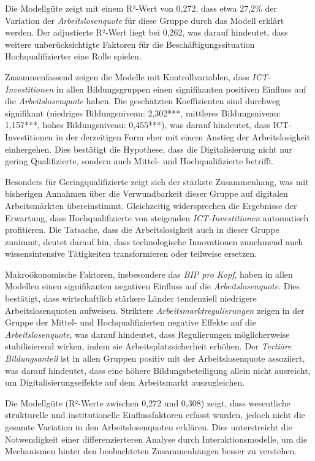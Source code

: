 Die Modellgüte zeigt mit einem R²-Wert von 0,272, dass etwa 27,2\% der Variation der 
\textit{Arbeitslosenquote} für diese Gruppe durch das Modell erklärt werden. Der adjustierte 
R²-Wert liegt bei 0,262, was darauf hindeutet, dass weitere unberücksichtigte Faktoren für die 
Beschäftigungssituation Hochqualifizierter eine Rolle spielen.

Zusammenfassend zeigen die Modelle mit Kontrollvariablen, dass \textit{\ac{ICT}-Investitionen} in 
allen Bildungsgruppen einen signifikanten positiven Einfluss auf die \textit{Arbeitslosenquote} 
haben. Die geschätzten Koeffizienten sind durchweg signifikant (niedriges Bildungsniveau: 
2,302***, mittleres Bildungsniveau: 1,157***, hohes Bildungsniveau: 0,455***), was darauf 
hindeutet, dass \ac{ICT}-Investitionen in der derzeitigen Form eher mit einem Anstieg der 
Arbeitslosigkeit einhergehen. Dies bestätigt die Hypothese, dass die Digitalisierung nicht nur 
gering Qualifizierte, sondern auch Mittel- und Hochqualifizierte betrifft.

Besonders für Geringqualifizierte zeigt sich der stärkste Zusammenhang, was mit bisherigen 
Annahmen über die Verwundbarkeit dieser Gruppe auf digitalen Arbeitsmärkten übereinstimmt. 
Gleichzeitig widersprechen die Ergebnisse der Erwartung, dass Hochqualifizierte von steigenden 
\textit{\ac{ICT}-Investitionen} automatisch profitieren. Die Tatsache, dass die Arbeitslosigkeit 
auch in dieser Gruppe zunimmt, deutet darauf hin, dass technologische Innovationen zunehmend auch 
wissensintensive Tätigkeiten transformieren oder teilweise ersetzen.

Makroökonomische Faktoren, insbesondere das \textit{\ac{BIP} pro Kopf}, haben in allen Modellen 
einen signifikanten negativen Einfluss auf die \textit{Arbeitslosenquote}. Dies bestätigt, dass 
wirtschaftlich stärkere Länder tendenziell niedrigere Arbeitslosenquoten aufweisen. Striktere 
\textit{Arbeitsmarktregulierungen} zeigen in der Gruppe der Mittel- und Hochqualifizierten 
negative Effekte auf die \textit{Arbeitslosenquote}, was darauf hindeutet, dass Regulierungen 
möglicherweise stabilisierend wirken, indem sie Arbeitsplatzsicherheit erhöhen. Der 
\textit{Tertiäre Bildungsanteil} ist in allen Gruppen positiv mit der Arbeitslosenquote 
assoziiert, was darauf hindeutet, dass eine höhere Bildungsbeteiligung allein nicht ausreicht, 
um Digitalisierungseffekte auf dem Arbeitsmarkt auszugleichen.

Die Modellgüte (R²-Werte zwischen 0,272 und 0,308) zeigt, dass wesentliche strukturelle und 
institutionelle Einflussfaktoren erfasst wurden, jedoch nicht die gesamte Variation in den 
Arbeitslosenquoten erklären. Dies unterstreicht die Notwendigkeit einer differenzierteren Analyse 
durch Interaktionsmodelle, um die Mechanismen hinter den beobachteten Zusammenhängen besser zu 
verstehen.

